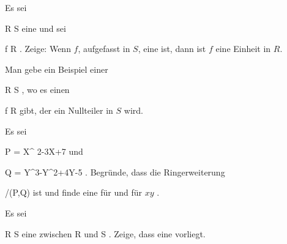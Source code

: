 {}
{





Es sei

\mavergleichskette
{\vergleichskette
{ R
}
{ \subseteq }{ S
}
{  }{
}
{    }{
}
{   }{
}
}
{}{}{}
eine
und sei

\mavergleichskette
{\vergleichskette
{ f
}
{ \in }{ R
}
{  }{
}
{    }{
}
{   }{
}
}
{}{}{.}
Zeige: Wenn $f$, aufgefasst in $S$, eine
ist, dann ist $f$ eine Einheit in $R$.





}
{} {}

{}
{





Man gebe ein Beispiel einer

\mavergleichskette
{\vergleichskette
{ R
}
{ \subseteq }{ S
}
{  }{
}
{    }{
}
{   }{
}
}
{}{}{,}
wo es einen

\mavergleichskette
{\vergleichskette
{ f
}
{ \in }{ R
}
{  }{
}
{    }{
}
{   }{
}
}
{}{}{}
gibt, der ein Nullteiler in $S$ wird.





}
{} {}

{}
{





Es sei

\mavergleichskettedisp
{\vergleichskette
{P
}
{ =} { X^ 2-3X+7
}
{ } {
}
{ } {
}
{ } {
}
}
{}{}{}
und

\mavergleichskettedisp
{\vergleichskette
{Q
}
{ =} { Y^3-Y^2+4Y-5
}
{ } {
}
{ } {
}
{ } {
}
}
{}{}{.}
Begründe, dass die Ringerweiterung

\mavergleichskettedisp
{\vergleichskette
{\Z
}
{ \subseteq} { \Z[X,Y]/(P,Q)
}
{ } {
}
{ } {
}
{ } {
}
}
{}{}{}
ist und finde eine
für
 und für $xy$
 {} {.}





}
{} {}

{}
{





Es sei

\mavergleichskette
{\vergleichskette
{R
}
{ \subseteq }{ S
}
{  }{
}
{    }{
}
{   }{
}
}
{}{}{}
eine
zwischen
\mathkor {} {R} {und} {S} {.}
Zeige, dass eine
vorliegt.





}
{} {}


